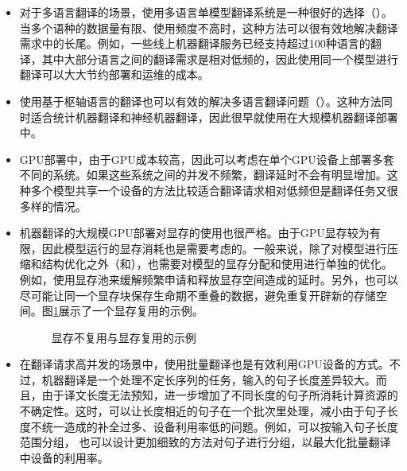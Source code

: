 \begin{itemize}
\vspace{0.5em}
\item 对于多语言翻译的场景，使用多语言单模型翻译系统是一种很好的选择（{\chaptersixteen}）。当多个语种的数据量有限、使用频度不高时，这种方法可以很有效地解决翻译需求中的长尾。例如，一些线上机器翻译服务已经支持超过100种语言的翻译，其中大部分语言之间的翻译需求是相对低频的，因此使用同一个模型进行翻译可以大大节约部署和运维的成本。

\vspace{0.5em}
\item 使用基于枢轴语言的翻译也可以有效的解决多语言翻译问题（{\chaptersixteen}）。这种方法同时适合统计机器翻译和神经机器翻译，因此很早就使用在大规模机器翻译部署中。

\vspace{0.5em}
\item GPU部署中，由于GPU成本较高，因此可以考虑在单个GPU设备上部署多套不同的系统。如果这些系统之间的并发不频繁，翻译延时不会有明显增加。这种多个模型共享一个设备的方法比较适合翻译请求相对低频但是翻译任务又很多样的情况。

\vspace{0.5em}
\item 机器翻译的大规模GPU部署对显存的使用也很严格。由于GPU显存较为有限，因此模型运行的显存消耗也是需要考虑的。一般来说，除了对模型进行压缩和结构优化之外（{\chapterfourteen}和{\chapterfifteen}），也需要对模型的显存分配和使用进行单独的优化。例如，使用显存池来缓解频繁申请和释放显存空间造成的延时。另外，也可以尽可能让同一个显存块保存生命期不重叠的数据，避免重复开辟新的存储空间。图\ref{fig:18-4}展示了一个显存复用的示例。

\begin{figure}[htp]
\centering

\caption{显存不复用与显存复用的示例}
\label{fig:18-4}
\end{figure}
\vspace{0.5em}
\item 在翻译请求高并发的场景中，使用批量翻译也是有效利用GPU设备的方式。不过，机器翻译是一个处理不定长序列的任务，输入的句子长度差异较大。而且，由于译文长度无法预知，进一步增加了不同长度的句子所消耗计算资源的不确定性。这时，可以让长度相近的句子在一个批次里处理，减小由于句子长度不统一造成的补全过多、设备利用率低的问题。例如，可以按输入句子长度范围分组， 也可以设计更加细致的方法对句子进行分组，以最大化批量翻译中设备的利用率。

\vspace{0.5em}
\end{itemize}

